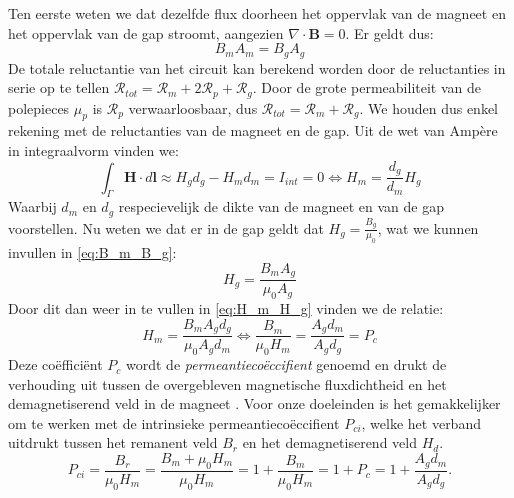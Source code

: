 \documentclass[we,twoside,openright,a4paper,11pt]{uantwerpenbamathesis}
\begin{document}
Ten eerste weten we dat dezelfde flux doorheen het oppervlak van de magneet en het oppervlak van de gap stroomt, aangezien $\nabla \cdot \mathbf{B}=0$. Er geldt dus:
\begin{equation}\label{eq:B_m_B_g}
    B_m A_m = B_g A_g
\end{equation}
De totale reluctantie van het circuit kan berekend worden door de reluctanties in serie op te tellen $\mathcal{R}_{tot}=\mathcal{R}_{m}+2\mathcal{R}_{p}+\mathcal{R}_{g}$. Door de grote permeabiliteit van de polepieces $\mu_p$ is $\mathcal{R}_{p}$ verwaarloosbaar, dus $\mathcal{R}_{tot}=\mathcal{R}_{m}+\mathcal{R}_{g}$. We houden dus enkel rekening met de reluctanties van de magneet en de gap. Uit de wet van Ampère in integraalvorm vinden we:
\begin{equation}\label{eq:H_m_H_g}
    \int_\Gamma \mathbf{H}\cdot d\mathbf{l} \approx H_g d_g - H_m d_m = I_{int}=0 \Leftrightarrow H_m = \frac{d_g}{d_m}H_g
\end{equation}
Waarbij $d_m$ en $d_g$ respecievelijk de dikte van de magneet en van de gap voorstellen. Nu weten we dat er in de gap geldt dat $H_g = \frac{B_g}{\mu_0}$, wat we kunnen invullen in \ref{eq:B_m_B_g}:
\begin{equation}
    H_g = \frac{B_m A_g}{\mu_0 A_g}
\end{equation}
Door dit dan weer in te vullen in \ref{eq:H_m_H_g} vinden we de relatie:
\begin{equation}
    H_m = \frac{B_m A_g d_g}{\mu_0 A_g d_m} \Leftrightarrow \frac{B_m}{\mu_0 H_m} = \frac{A_g d_m}{A_g d_g} = P_c
\end{equation}
Deze coëfficiënt $P_c$ wordt de \textit{permeantiecoëccifient} genoemd en drukt de verhouding uit tussen de overgebleven magnetische fluxdichtheid en het demagnetiserend veld in de magneet \cite{mmpa_permanent_magnet_guidelines}. Voor onze doeleinden is het gemakkelijker om te werken met de intrinsieke permeantiecoëccifient $P_{ci}$, welke het verband uitdrukt tussen het remanent veld $B_r$ en het demagnetiserend veld $H_d$.
\begin{equation}
    P_{ci}=\frac{B_r}{\mu_0 H_m}=\frac{B_m+\mu_0 H_m}{\mu_0 H_m}=1+\frac{B_m}{\mu_0 H_m}=1+P_c = 1+\frac{A_g d_m}{A_g d_g}. 
\end{equation}
\end{document}

